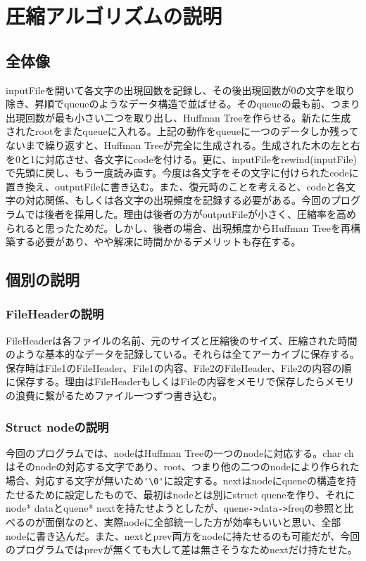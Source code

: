 \section{圧縮アルゴリズムの説明}
\subsection{全体像}
inputFileを開いて各文字の出現回数を記録し、その後出現回数が0の文字を取り除き、昇順でqueueのようなデータ構造で並ばせる。そのqueueの最も前、つまり出現回数が最も小さい二つを取り出し、Huffman Treeを作らせる。新たに生成されたrootをまたqueueに入れる。上記の動作をqueueに一つのデータしか残ってないまで繰り返すと、Huffman Treeが完全に生成される。生成された木の左と右を0と1に対応させ、各文字にcodeを付ける。更に、inputFileをrewind(inputFile)で先頭に戻し、もう一度読み直す。今度は各文字をその文字に付けられたcodeに置き換え、outputFileに書き込む。また、復元時のことを考えると、codeと各文字の対応関係、もしくは各文字の出現頻度を記録する必要がある。今回のプログラムでは後者を採用した。理由は後者の方がoutputFileが小さく、圧縮率を高められると思ったためだ。しかし、後者の場合、出現頻度からHuffman Treeを再構築する必要があり、やや解凍に時間かかるデメリットも存在する。
\subsection{個別の説明}
\subsubsection{FileHeaderの説明}
FileHeaderは各ファイルの名前、元のサイズと圧縮後のサイズ、圧縮された時間のような基本的なデータを記録している。それらは全てアーカイブに保存する。保存時はFile1のFileHeader、File1の内容、File2のFileHeader、File2の内容の順に保存する。理由はFileHeaderもしくはFileの内容をメモリで保存したらメモリの浪費に繋がるためファイル一つずつ書き込む。

\subsubsection{Struct  nodeの説明}
今回のプログラムでは、nodeはHuffman Treeの一つのnodeに対応する。char chはそのnodeの対応する文字であり、root、つまり他の二つのnodeにより作られた場合、対応する文字が無いため\verb|'\0'|に設定する。nextはnodeにqueneの構造を持たせるために設定したもので、最初はnodeとは別にstruct queneを作り、それにnode* dataとquene* nextを持たせようとしたが、quene\verb|->|data\verb|->|freqの参照と比べるのが面倒なのと、実際nodeに全部統一した方が効率もいいと思い、全部nodeに書き込んだ。また、nextとprev両方をnodeに持たせるのも可能だが、今回のプログラムではprevが無くても大して差は無さそうなためnextだけ持たせた。

